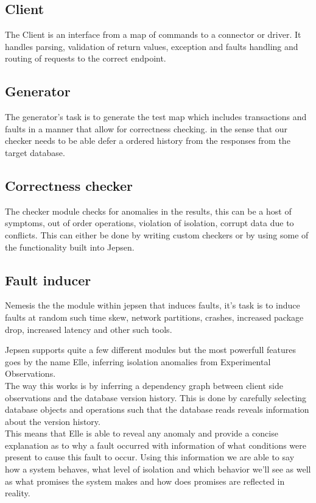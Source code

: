 \documentclass[a4paper,10pt,titlepage]{report}
\begin{document}
\subsection{Client}
The Client is an interface from a map of commands to a connector or driver. It handles parsing, validation of return values, exception and faults handling and routing of requests to the correct endpoint.

\subsection{Generator}
The generator's task is to generate the test map which includes transactions and faults in a manner that allow for correctness checking. in the sense that our checker needs to be able defer a ordered history from the responses from the target database.

\subsection{Correctness checker}
The checker module checks for anomalies in the results, this can be a host of symptoms, out of order operations, violation of isolation, corrupt data due to conflicts. This can either be done by writing custom checkers or by using some of the functionality built into Jepsen.

\subsection{Fault inducer}
Nemesis the the module within jepsen that induces faults, it's task is to induce faults at random such time skew, network partitions, crashes, increased package drop, increased latency and other such tools.




Jepsen supports quite a few different modules but the most powerfull features goes by the name Elle, inferring isolation anomalies from Experimental Observations. \\
\vspace{5mm}
The way this works is by inferring a dependency graph between client side observations and the database version history. This is done by carefully selecting database objects and operations such that the database reads reveals information about the version history.\\
\vspace{5mm}
This means that Elle is able to reveal any anomaly and provide a concise explanation as to why a fault occurred with information of what conditions were present to cause this fault to occur. Using this information we are able to say how a system behaves, what level of isolation and which behavior we'll see as well as what promises the system makes and how does promises are reflected in reality.\\
\vspace{5mm}
\end{document}

